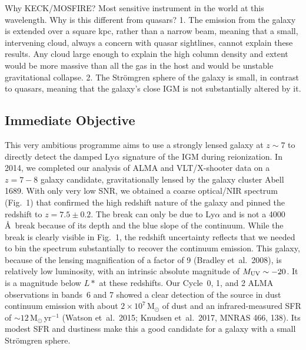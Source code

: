 \documentclass[letter,12pt]{article}
\begin{document}
Why KECK/MOSFIRE? Most sensitive instrument in the world at this wavelength.
Why is this different from quasars?
1. The emission from the galaxy is extended over a square kpc, rather than a narrow beam, meaning that a small, intervening cloud, always a concern with quasar sightlines, cannot explain these results. Any cloud large enough to explain the high column density and extent would be more massive than all the gas in the host and would be unstable gravitational collapse.
2. The Str\"{o}mgren sphere of the galaxy is small, in contrast to quasars, meaning that the galaxy's close IGM is not substantially altered by it.


\subsection{Immediate Objective}
This very ambitious programme aims to use a
strongly lensed galaxy at $z\sim7$ to directly detect the damped Ly$\alpha$
signature of the IGM during reionization. In 2014, we completed our analysis of ALMA and
VLT/X-shooter data on a $z=7-8$ galaxy candidate, gravitationally lensed by
the galaxy cluster Abell\,1689.  With only very low SNR, we
obtained a coarse optical/NIR spectrum (Fig.~1) that confirmed the high
redshift nature of the galaxy and pinned the redshift to $z=7.5\pm0.2$. 
The break can only be due to Ly$\alpha$ and is not a 4000\,\AA\ break
because of its depth and the blue slope of the continuum.  While the break is clearly visible in Fig.~1, the redshift
uncertainty reflects that we needed to bin the spectrum substantially to
recover the continuum emission.  This galaxy, because of the lensing
magnification of a factor of 9 (Bradley et~al.\ 2008),
is relatively low luminosity, with an intrinsic absolute magnitude of
$M_{\rm UV}\sim-20$.  It is a magnitude below $L*$ at these redshifts. 
Our Cycle~0, 1, and 2 ALMA observations in bands~6 and 7 showed a clear
detection of the source in dust continuum emission with about
$2\times10^7$\,M$_\odot$ of dust and an infrared-measured SFR of
$\sim12$\,M$_\odot$\,yr$^{-1}$ (Watson et~al.\ 2015; Knudsen et~al.\ 2017,
MNRAS 466, 138). Its modest SFR and dustiness make this a good candidate for a galaxy with a small Str\"omgren sphere.
\end{document}
